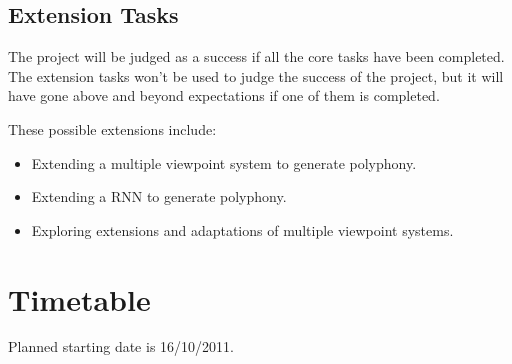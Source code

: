 \documentclass[12pt,a4paper,twoside]{article}
\begin{document}
\subsection*{Extension Tasks}

The project will be judged as a success if all the core tasks have been
completed. The extension tasks won't be used to judge the success of the
project, but it will have gone above and beyond expectations if one of them is
completed.

These possible extensions include:
\begin{itemize}
	\item Extending a multiple viewpoint system to generate polyphony.
	\item Extending a RNN to generate polyphony.
	\item Exploring extensions and adaptations of multiple viewpoint
		systems.
\end{itemize}

\section*{Timetable}

Planned starting date is 16/10/2011.
\end{document}
